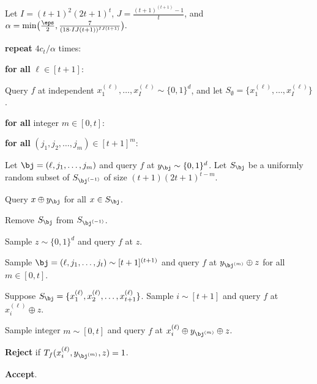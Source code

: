\documentclass[11pt]{article}
\numberwithin{equation}{section}
\theoremstyle{definition}
\theoremstyle{plain}
\begin{document}
\begin{algorithm} %
	\caption{A $t$-Online-Erasure-Resilient Quadraticity Tester}
	\begin{algorithmic}[1]
	
		
		\State Let $I = (t+1)^{2}(2t+1)^t$, $J = \frac{(t+1)^{(t+1)}-1}{t}$, and  $\alpha =  \min \bigl( \frac{\eps}{2}, \frac{7}{(18 \cdot IJ(t+1))^{I J (t+1)}} \bigr).$
		\label{step:def_constants}
		
		\State\textbf{repeat} $4c_t/\alpha$ times: 
		
		\State \indent \textbf{for all} $\ell \in [t+1]$:
		
		\State \indent \indent Query $f$ at independent $x_1^{(\ell)}, \dots, x_I^{(\ell)} \sim \{0,1\}^d$, and let $S_\emptyset = \{x_1^{(\ell)}, \dots, x_I^{(\ell)}\}$. \label{step:query_y}
		
		\State \indent \indent   \textbf{for all} integer $m \in [0,t]$:

		\State \indent  \indent \indent   \textbf{for all} $(j_1, j_2, \dots, j_m) \in [t+1]^{m}$:  \label{step:query_x}
		
		\State \indent \indent \indent  \indent Let $\bj = (\ell, j_1, \dots, j_m)$ and query $f$ at $y_{\bj}  \sim \{0,1\}^d$. 
%
%
		\State \indent \indent \indent  \indent Let $S_{\bj}$ be a uniformly random subset of $S_{\bj^{(-1)}}$ of size $(t+1)(2t+1)^{t-m}$. \label{step:random_subset}
		
		\State \indent \indent \indent  \indent Query $x \oplus y_{\bj}$ for all $x \in S_{\bj}$. \label{step:query_xy}
		
		\State \indent \indent \indent  \indent Remove $S_{\bj}$ from $S_{\bj^{(-1)}}$. 
		
	
		\State \indent Sample $z \sim \{0,1\}^d$ and query $f$ at $z$.  \label{step:query_z}
		
		\State \indent Sample $\bj = (\ell, j_1, \dots, j_{t}) \sim [t+1]^{(t+1)}$ and query $f$ at $y_{\bj^{(m)}}   \oplus z$ for all $m \in [0,t]$. \label{step:query_indices}
		
		
		\State \indent Suppose $S_{\bj}   = \{x_1^{(\ell)}, x_2^{(\ell)}, \dots, x_{t+1}^{(\ell)}\}$.  Sample $i \sim [t+1]$ and query $f$ at $x_i^{(\ell)} \oplus z$.

		\label{step:query_zy}
		
		\State \indent Sample integer $m \sim [0,t]$ and query $f$ at $x_{i}^{(\ell)} \oplus y_{\bj^{(m)}}   \oplus  z$.\label{step:3sum}
		
	
		\State \indent \textbf{Reject} if $T_f(x_{i}^{(\ell)}, y_{\bj^{(m)}} , z) = 1$. 
		
		\State \textbf{Accept}. 
	\end{algorithmic}
	\label{alg:quadratic_t}
\end{algorithm}
\end{document}
